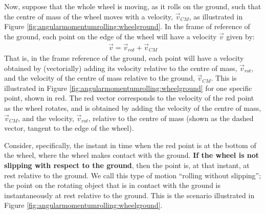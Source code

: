 Now, suppose that the whole wheel is moving, as it rolls on the ground, such that the centre of mass of the wheel moves with a velocity, $\vec v_{CM}$, as illustrated in Figure \ref{fig:angularmomentumrolling:wheelground}.
In the frame of reference of the ground, each point on the edge of the wheel will have a velocity $\vec v$ given by:
\begin{align*}
\vec v = \vec v_{rot} + \vec v_{CM}
\end{align*}
That is, in the frame reference of the ground, each point will have a velocity obtained by (vectorially) adding its velocity relative to the centre of mass, $\vec v_{rot}$, and the velocity of the centre of mass relative to the ground, $\vec v_{CM}$. This is illustrated in Figure \ref{fig:angularmomentumrolling:wheelground} for one specific point, shown in red. The red vector corresponds to the velocity of the red point as the wheel rotates, and is obtained by adding the velocity of the centre of mass, $\vec v_{CM}$, and the velocity, $\vec v_{rot}$, relative to the centre of mass (shown as the dashed vector, tangent to the edge of the wheel). 

Consider, specifically, the instant in time when the red point is at the bottom of the wheel, where the wheel makes contact with the ground. \textbf{If the wheel is not slipping with respect to the ground}, then the point is, at that instant, at rest relative to the ground. We call this type of motion ``rolling without slipping''; the point on the rotating object that is in contact with the ground is instantaneously at rest relative to the ground. This is the scenario illustrated in Figure \ref{fig:angularmomentumrolling:wheelground}.

